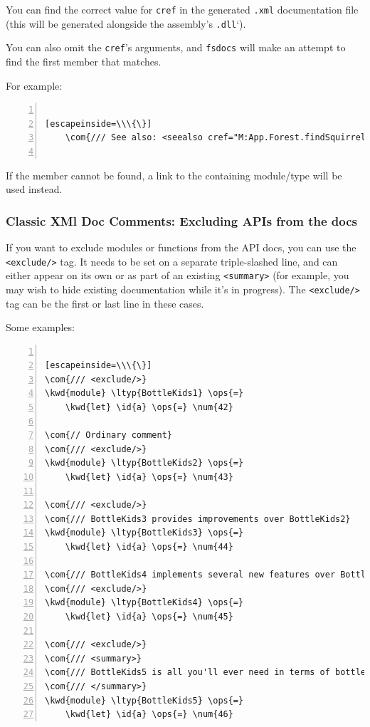 \documentclass{article}
\newcommand{\id}[1]{\textcolor{black}{#1}}
\newcommand{\com}[1]{\textcolor{officegreen}{#1}}
\newcommand{\kwd}[1]{\textcolor{navy}{#1}}
\newcommand{\num}[1]{\textcolor{officegreen}{#1}}
\newcommand{\ops}[1]{\textcolor{purple}{#1}}
\begin{document}
You can find the correct value for \texttt{cref} in the generated \texttt{.xml} documentation file (this will be generated alongside the assembly's \texttt{.dll}`).


You can also omit the \texttt{cref}'s arguments, and \texttt{fsdocs} will make an attempt to find the first member that matches.


For example:
\begin{lstlisting}[numbers=left]

[escapeinside=\\\{\}]
    \com{/// See also: <seealso cref="M:App.Forest.findSquirrels"/>}


\end{lstlisting}



If the member cannot be found, a link to the containing module/type will be used instead.
\subsubsection*{Classic XMl Doc Comments: Excluding APIs from the docs}



If you want to exclude modules or functions from the API docs, you can use the \texttt{<exclude/>} tag.
It needs to be set on a separate triple-slashed line, and can either appear on its own or as part
of an existing \texttt{<summary>} (for example, you may wish to hide existing documentation while it's in progress).
The \texttt{<exclude/>} tag can be the first or last line in these cases.


Some examples:
\begin{lstlisting}[numbers=left]

[escapeinside=\\\{\}]
\com{/// <exclude/>}
\kwd{module} \ltyp{BottleKids1} \ops{=}
    \kwd{let} \id{a} \ops{=} \num{42}

\com{// Ordinary comment}
\com{/// <exclude/>}
\kwd{module} \ltyp{BottleKids2} \ops{=}
    \kwd{let} \id{a} \ops{=} \num{43}

\com{/// <exclude/>}
\com{/// BottleKids3 provides improvements over BottleKids2}
\kwd{module} \ltyp{BottleKids3} \ops{=}
    \kwd{let} \id{a} \ops{=} \num{44}

\com{/// BottleKids4 implements several new features over BottleKids3}
\com{/// <exclude/>}
\kwd{module} \ltyp{BottleKids4} \ops{=}
    \kwd{let} \id{a} \ops{=} \num{45}

\com{/// <exclude/>}
\com{/// <summary>}
\com{/// BottleKids5 is all you'll ever need in terms of bottles or kids.}
\com{/// </summary>}
\kwd{module} \ltyp{BottleKids5} \ops{=}
    \kwd{let} \id{a} \ops{=} \num{46}

\end{lstlisting}
\end{document}

